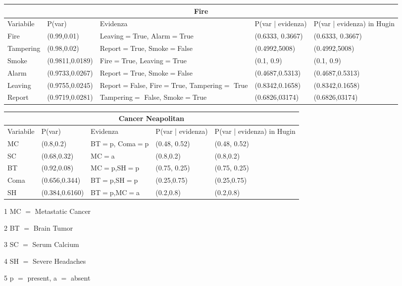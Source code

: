 \documentclass{report}
\begin{document}
\begin{table}[hbt!]
\small

\hskip-1.0cm\begin{tabular}{ |p{2cm}||p{2cm}|p{2cm}|p{3cm}|p{3cm}|  }
\hline
 \multicolumn{5}{|c|}{Fire} \\
 \hline
Variabile & P(var) & Evidenza & P(var | evidenza) & P(var | evidenza)  in Hugin\\
 \hline
Fire &(0.99,0.01) & Leaving$=$True, Alarm$=$True & (0.6333, 0.3667) &(0.6333, 0.3667)\\
\hline
Tampering & (0.98,0.02) & Report$=$True, Smoke$=$False & (0.4992,5008)&  (0.4992,5008)\\
\hline
Smoke & (0.9811,0.0189) & Fire$=$True, Leaving$=$True & (0.1, 0.9) & (0.1, 0.9)\\
\hline
Alarm & (0.9733,0.0267) & Report$=$True, Smoke$=$False & (0.4687,0.5313) & (0.4687,0.5313)\\
\hline
Leaving & (0.9755,0.0245) & \makecell[l]{Report$=$False, \\ Fire$=$True, \\Tampering$=$ \\True} & (0.8342,0.1658) & (0.8342,0.1658)\\
\hline
Report & (0.9719,0.0281)&Tampering$=$ False, Smoke$=$True & (0.6826,03174) & (0.6826,03174)\\
\hline
\end{tabular}
\newline
\vspace*{0.5 cm}
\newline

\hskip-1.0cm\begin{threeparttable}
\begin{tabular}{ |p{2cm}||p{2cm}|p{2cm}|p{3cm}|p{3cm}|  }
\hline
 \multicolumn{5}{|c|}{Cancer Neapolitan} \\
 \hline
Variabile & P(var) & Evidenza & P(var | evidenza) & P(var | evidenza)  in Hugin\\
 \hline
MC &(0.8,0.2) & BT$=$p, Coma$=$p & (0.48, 0.52) &(0.48, 0.52)\\
\hline
SC & (0.68,0.32) & MC$=$a & (0.8,0.2)&  (0.8,0.2)\\
\hline
BT & (0.92,0.08) & MC$=$p,SH$=$p & (0.75, 0.25) &(0.75, 0.25)\\
\hline
Coma & (0.656,0.344) & BT$=$p,SH$=$p & (0.25,0.75) & (0.25,0.75)\\
\hline
SH & (0.384,0.6160) & BT$=$p,MC$=$a & (0.2,0.8) &(0.2,0.8)\\
\hline
\end{tabular}
\begin{tablenotes}
 	    \item[1] MC $=$ Metastatic Cancer
        \item[2] BT $=$ Brain Tumor
        \item[3] SC $=$ Serum Calcium
        \item[4] SH $=$ Severe Headaches
        \item[5] p $=$ present, a $=$ absent
 \end{tablenotes}
\end{threeparttable}
\end{table}
\end{document}
